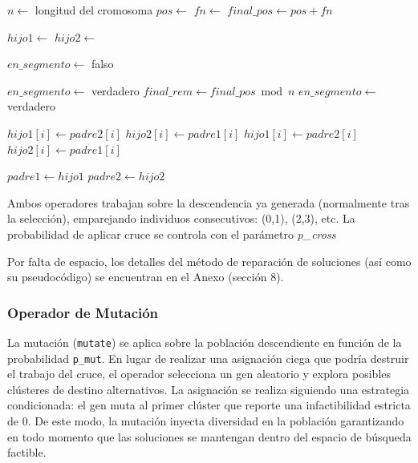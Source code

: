 \documentclass[a4paper,12pt]{article}%
\begin{document}
\begin{algorithm}[H]
	\begin{algorithmic}
		\State $n \leftarrow$ longitud del cromosoma
		\State $pos \leftarrow$  
		\State $fn \leftarrow$  
		\State $final\_pos \leftarrow pos + fn$
		
		\State $hijo1 \leftarrow$ 
		\State $hijo2 \leftarrow$ 
		
		\State $en\_segmento \leftarrow$ falso
		
		\State $en\_segmento \leftarrow$ verdadero
		\EndIf
		\Else
		\State $final\_rem \leftarrow final\_pos \bmod n$
		\State $en\_segmento \leftarrow$ verdadero
		\EndIf
		\EndIf
		
		\State $hijo1[i] \leftarrow padre2[i]$
		\State $hijo2[i] \leftarrow padre1[i]$
		\Else
		\State $hijo1[i] \leftarrow padre2[i]$
		\State $hijo2[i] \leftarrow padre1[i]$
		\EndIf
		\EndIf
		\EndFor
		
		\State $padre1 \leftarrow hijo1$
		\State $padre2 \leftarrow hijo2$
		
		\State {}
		\State {}
		\EndFunction
	\end{algorithmic}
\end{algorithm}

Ambos operadores trabajan sobre la descendencia ya generada (normalmente tras la selección), emparejando individuos consecutivos: (0,1), (2,3), etc. La probabilidad de aplicar cruce se controla con el parámetro \textit{p\_cross}

Por falta de espacio, los detalles del método de reparación de soluciones (así como su pseudocódigo) se encuentran en el Anexo (sección 8).


\subsubsection*{Operador de Mutación}
\noindent La mutación (\texttt{mutate}) se aplica sobre la población descendiente en función de la probabilidad \texttt{p\_mut}. En lugar de realizar una asignación ciega que podría destruir el trabajo del cruce, el operador selecciona un gen aleatorio y explora posibles clústeres de destino alternativos. La asignación se realiza siguiendo una estrategia condicionada: el gen muta al primer clúster que reporte una infactibilidad estricta de 0. De este modo, la mutación inyecta diversidad en la población garantizando en todo momento que las soluciones se mantengan dentro del espacio de búsqueda factible.
\end{document}
